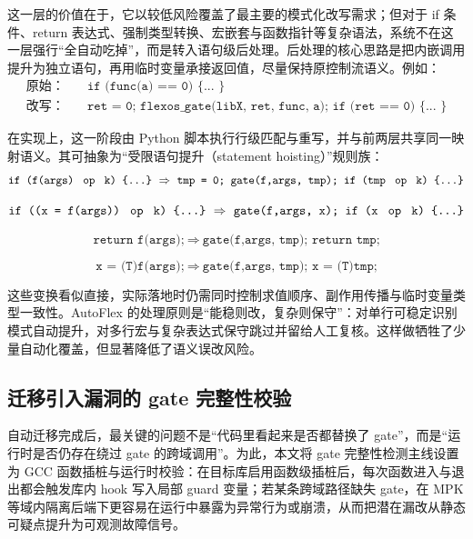\documentclass[UTF8,a4paper,12pt]{ctexart}
\numberwithin{equation}{section}
\begin{document}
这一层的价值在于，它以较低风险覆盖了最主要的模式化改写需求；但对于 if
条件、return
表达式、强制类型转换、宏嵌套与函数指针等复杂语法，系统不在这一层强行``全自动吃掉''，而是转入语句级后处理。后处理的核心思路是把内嵌调用提升为独立语句，再用临时变量承接返回值，尽量保持原控制流语义。例如：
\begin{equation}
\begin{aligned}
\text{原始：}\quad & \texttt{if (func(a) == 0) \{ ... \}} \\
\text{改写：}\quad & \texttt{ret = 0;\ flexos\_gate(libX, ret, func, a);\ if (ret == 0) \{ ... \}}
\end{aligned}
\end{equation}

在实现上，这一阶段由 Python
脚本执行行级匹配与重写，并与前两层共享同一映射语义。其可抽象为``受限语句提升（statement
hoisting）''规则族：
\begin{equation}
\texttt{if (f(args) \;op\; k) \{...\}}\ \Rightarrow\ \texttt{tmp = 0; gate(f,args, tmp); if (tmp \;op\; k) \{...\}}
\end{equation}

\begin{equation}
\texttt{if ((x = f(args)) \;op\; k) \{...\}}\ \Rightarrow\ \texttt{gate(f,args, x); if (x \;op\; k) \{...\}}
\end{equation}

\begin{equation}
\texttt{return f(args);}\ \Rightarrow\ \texttt{gate(f,args, tmp); return tmp;}
\end{equation}

\begin{equation}
\texttt{x = (T)f(args);}\ \Rightarrow\ \texttt{gate(f,args, tmp); x = (T)tmp;}
\end{equation}

这些变换看似直接，实际落地时仍需同时控制求值顺序、副作用传播与临时变量类型一致性。AutoFlex
的处理原则是``能稳则改，复杂则保守''：对单行可稳定识别模式自动提升，对多行宏与复杂表达式保守跳过并留给人工复核。这样做牺牲了少量自动化覆盖，但显著降低了语义误改风险。

\subsection{迁移引入漏洞的 gate 完整性校验}

自动迁移完成后，最关键的问题不是``代码里看起来是否都替换了
gate''，而是``运行时是否仍存在绕过 gate 的跨域调用''。为此，本文将 gate
完整性检测主线设置为 GCC
函数插桩与运行时校验：在目标库启用函数级插桩后，每次函数进入与退出都会触发库内
hook 写入局部 guard 变量；若某条跨域路径缺失 gate，在 MPK
等域内隔离后端下更容易在运行中暴露为异常行为或崩溃，从而把潜在漏改从静态可疑点提升为可观测故障信号。
\end{document}
